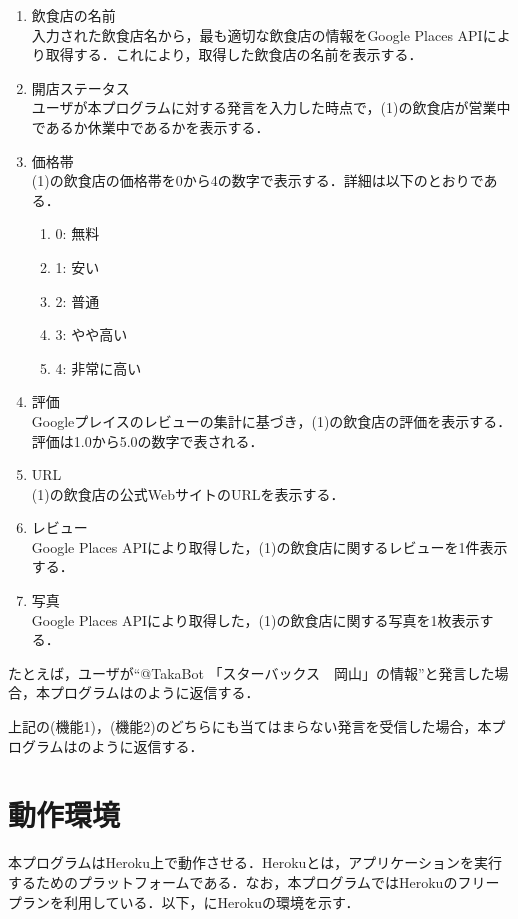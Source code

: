 \documentclass[12pt]{jsarticle}
\begin{document}
\begin{description}
  \begin{enumerate}
  \item 飲食店の名前 \\
    入力された飲食店名から，最も適切な飲食店の情報をGoogle Places APIにより取得する．これにより，取得した飲食店の名前を表示する．
  \item 開店ステータス \\
    ユーザが本プログラムに対する発言を入力した時点で，(1)の飲食店が営業中であるか休業中であるかを表示する．
  \item 価格帯 \\
    (1)の飲食店の価格帯を0から4の数字で表示する．詳細は以下のとおりである．
    \begin{enumerate}
    \item 0: 無料
    \item 1: 安い
    \item 2: 普通
    \item 3: やや高い
    \item 4: 非常に高い
    \end{enumerate}
  \item 評価 \\
    Googleプレイスのレビューの集計に基づき，(1)の飲食店の評価を表示する．評価は1.0から5.0の数字で表される．
  \item URL \\
    (1)の飲食店の公式WebサイトのURLを表示する．
  \item レビュー \\
    Google Places APIにより取得した，(1)の飲食店に関するレビューを1件表示する．
  \item 写真 \\
    Google Places APIにより取得した，(1)の飲食店に関する写真を1枚表示する．
  \end{enumerate}
  たとえば，ユーザが``@TakaBot 「スターバックス　岡山」の情報''と発言した場合，本プログラムはのように返信する．
  
\end{description}
上記の(機能1)，(機能2)のどちらにも当てはまらない発言を受信した場合，本プログラムはのように返信する．


\section{動作環境}
\label{sec:devenv}
本プログラムはHeroku\cite{heroku}上で動作させる．Herokuとは，アプリケーションを実行するためのプラットフォームである．なお，本プログラムではHerokuのフリープランを利用している．以下，にHerokuの環境を示す．
\end{document}
